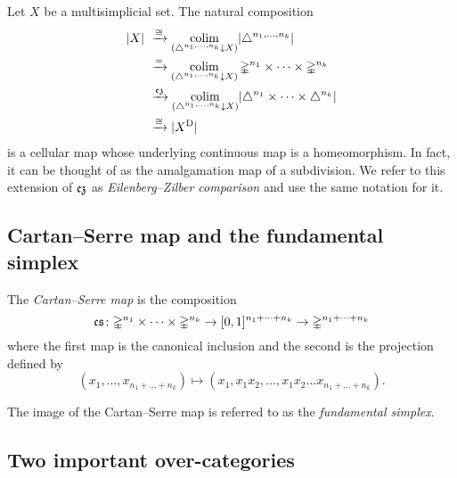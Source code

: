 Let $X$ be a multisimplicial set.
The natural composition
\begin{equation} \label{e:ez comparison}
\begin{split}
\lvert X\rvert \ &\xrightarrow{\cong}
\operatorname*{colim}_{(\triangle^{n_1, \dots, n_k} \downarrow X)} \lvert\triangle^{n_1, \dots, n_k}\rvert \\ &\xrightarrow{=}
\operatorname*{colim}_{(\triangle^{n_1, \dots, n_k} \downarrow X)} \mathbb{\Delta}^{n_1} \times \dots \times \mathbb{\Delta}^{n_k} \\ &\xrightarrow{\operatorname{\mathfrak{ez}}}
\operatorname*{colim}_{(\triangle^{n_1, \dots, n_k} \downarrow X)} \lvert\triangle^{n_1} \times \dots \times \triangle^{n_k}\rvert \\ &\xrightarrow{\cong}
\lvert X^{\mathrm{D}}\rvert
\end{split}
\end{equation}
is a cellular map whose underlying continuous map is a homeomorphism.
In fact, it can be thought of as the amalgamation map of a subdivision.
We refer to this extension of $\operatorname{\mathfrak{ez}}$ as \textit{Eilenberg--Zilber comparison} and use the same notation for it.

\subsection{Cartan--Serre map and the fundamental simplex}

The \textit{Cartan--Serre map} is the composition
\[
\operatorname{\mathfrak{cs}} \colon
\mathbb{\Delta}^{n_1} \times \dots \times \mathbb{\Delta}^{n_k} \to
[0,1]^{n_1 + \dots + n_k} \to
\mathbb{\Delta}^{n_1 + \dots + n_k}
\]
where the first map is the canonical inclusion and the second is the projection defined by
\[
(x_1, \dots, x_{n_1 + \dots + n_k}) \mapsto (x_1, x_1x_2, \dots, x_1x_2 \dots x_{n_1 + \dots + n_k}).
\]


The image of the Cartan--Serre map is referred to as the \textit{fundamental simplex}. 

\subsection{Two important over-categories}


